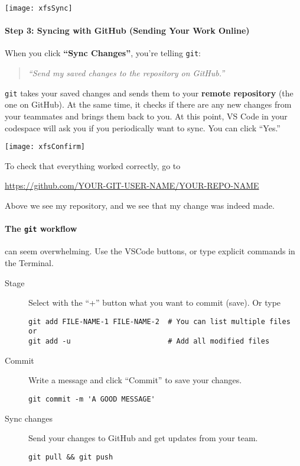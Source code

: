 \documentclass{ximera}
\begin{document}
\newpage

\begin{image}
    \texttt{[image: xfsSync]}
\end{image}
\paragraph{Step 3: Syncing with GitHub (Sending Your Work Online)}
When you click \textbf{``Sync Changes''}, you're telling \verb!git!:
\begin{quote}
    \emph{``Send my saved changes to the repository on GitHub.''}
\end{quote}
\verb!git! takes your saved changes and sends them to your \textbf{remote
    repository}
(the one on GitHub). At the same time, it checks if there are any new
changes from your teammates and brings them back to you. At this point,
VS Code in your codespace will ask you if you periodically want to sync.
You can click ``Yes.''
\pdfOnly{\end{multicols*}}

\newpage

\begin{image}
    \texttt{[image: xfsConfirm]}
\end{image}
To check that everything worked correctly, go to
\begin{center}
    \url{https://github.com/YOUR-GIT-USER-NAME/YOUR-REPO-NAME}
\end{center}
Above we see my repository, and we see that my change was indeed made.


\paragraph{The \texttt{git} workflow} can seem overwhelming. Use the VSCode buttons, or type explicit commands in the Terminal.
\begin{description}
    \item[Stage] Select with the ``+'' button what you want to
        commit (save). Or type
{\footnotesize
\begin{verbatim}
git add FILE-NAME-1 FILE-NAME-2  # You can list multiple files or
git add -u                       # Add all modified files 
\end{verbatim}
}
    \item[Commit] Write a message and click ``Commit'' to save
          your changes. 
\begin{verbatim}
git commit -m 'A GOOD MESSAGE'
\end{verbatim}
\pdfOnly{\end{description}}
\pdfOnly{\begin{minipage}{\columnwidth}}
\pdfOnly{\begin{description}}    
    \item[Sync changes] Send your changes to GitHub and get updates from
          your  team.
\begin{verbatim}
git pull && git push
\end{verbatim}
\end{description}
\end{document}
